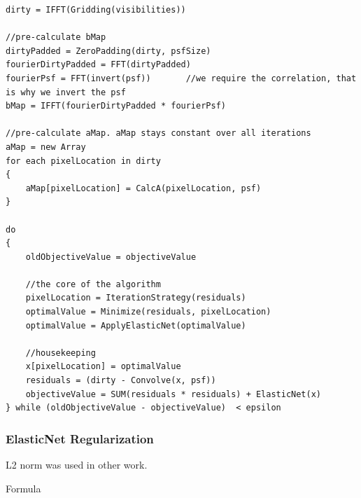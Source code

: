 \begin{lstlisting}
dirty = IFFT(Gridding(visibilities))

//pre-calculate bMap
dirtyPadded = ZeroPadding(dirty, psfSize)
fourierDirtyPadded = FFT(dirtyPadded)
fourierPsf = FFT(invert(psf))		//we require the correlation, that is why we invert the psf
bMap = IFFT(fourierDirtyPadded * fourierPsf)

//pre-calculate aMap. aMap stays constant over all iterations
aMap = new Array
for each pixelLocation in dirty 
{
	aMap[pixelLocation] = CalcA(pixelLocation, psf)
}
    
do 
{
	oldObjectiveValue = objectiveValue
	
	//the core of the algorithm
	pixelLocation = IterationStrategy(residuals)
	optimalValue = Minimize(residuals, pixelLocation)
	optimalValue = ApplyElasticNet(optimalValue)
	
	//housekeeping
	x[pixelLocation] = optimalValue
	residuals = (dirty - Convolve(x, psf))
	objectiveValue = SUM(residuals * residuals) + ElasticNet(x)
} while (oldObjectiveValue - objectiveValue)  < epsilon
\end{lstlisting}



\subsubsection{ElasticNet Regularization} \label{dist:deconv:reg}
L2 norm was used in other work. \cite{ferrari2014distributed}


Formula

